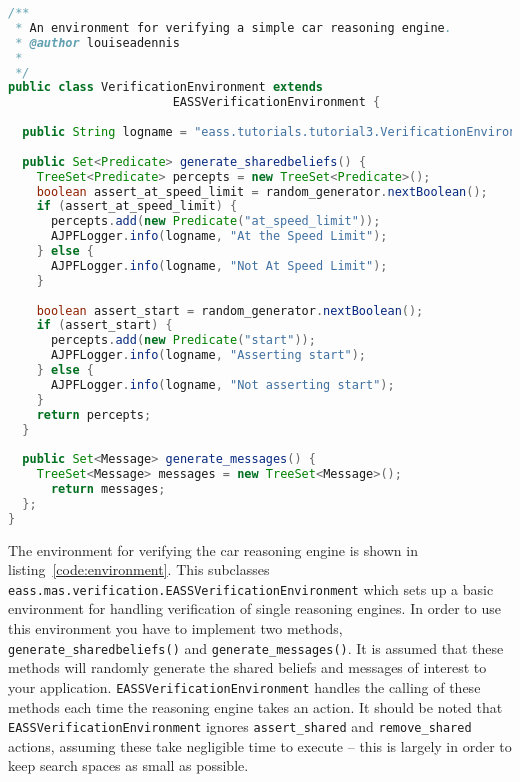 \documentclass[a4]{article}
\begin{document}
\begin{lstlisting}[float,caption=A Verification Environment,basicstyle=\sffamily,style=easslisting,language=Java,label=code:environment]
/**
 * An environment for verifying a simple car reasoning engine.
 * @author louiseadennis
 *
 */
public class VerificationEnvironment extends 
                       EASSVerificationEnvironment {
			
  public String logname = "eass.tutorials.tutorial3.VerificationEnvironment";
	
  public Set<Predicate> generate_sharedbeliefs() {
    TreeSet<Predicate> percepts = new TreeSet<Predicate>();
    boolean assert_at_speed_limit = random_generator.nextBoolean();
    if (assert_at_speed_limit) {
      percepts.add(new Predicate("at_speed_limit"));
      AJPFLogger.info(logname, "At the Speed Limit");
    } else {
      AJPFLogger.info(logname, "Not At Speed Limit");
    }
		
    boolean assert_start = random_generator.nextBoolean();
    if (assert_start) {
      percepts.add(new Predicate("start"));
      AJPFLogger.info(logname, "Asserting start");
    } else {
      AJPFLogger.info(logname, "Not asserting start");
    }
    return percepts;
  }
	
  public Set<Message> generate_messages() {
    TreeSet<Message> messages = new TreeSet<Message>();
      return messages;
  };
}
\end{lstlisting}
\begin{sloppypar}
The environment for verifying the car reasoning engine is shown in listing~\ref{code:environment}.  This subclasses \texttt{eass.mas.verification.EASSVerificationEnvironment} which sets up a basic environment for handling verification of single reasoning engines.  In order to use this environment you have to implement two methods, \texttt{generate\_sharedbeliefs()} and \texttt{generate\_messages()}.  It is assumed that these methods will randomly generate the shared beliefs and messages of interest to your application.  \texttt{EASSVerificationEnvironment} handles the calling of these methods each time the reasoning engine takes an action.  It should be noted that \texttt{EASSVerificationEnvironment} ignores \lstinline{assert_shared} and \lstinline{remove_shared} actions, assuming these take negligible time to execute -- this is largely in order to keep search spaces as small as possible.
\end{sloppypar}
\end{document}
